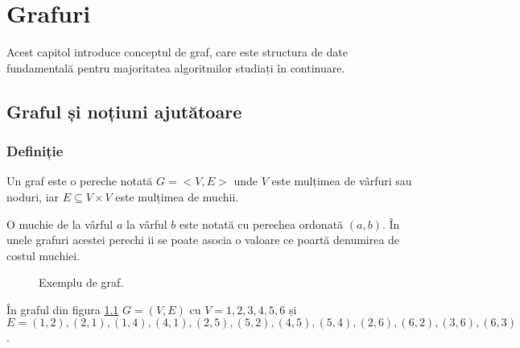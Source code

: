 \chapter{Grafuri}

Acest capitol introduce conceptul de graf, care este structura de date fundamentală pentru majoritatea algoritmilor studiați în continuare.

\section{Graful și noțiuni ajutătoare}

\subsection{Definiție}

Un graf este o pereche notată $G=<V,E>$ unde $V$ este mulțimea de vârfuri sau noduri, iar $E\subseteq V \times V$ este mulțimea de muchii.

O muchie de la vârful $a$ la vârful $b$ este notată cu perechea ordonată $(a,b)$. În unele grafuri acestei perechi ii se poate asocia o valoare ce poartă denumirea de costul muchiei.

\begin{figure}[H] 
	\centering	
	{
	}
	\caption{Exemplu de graf.} 
	\label{fig:simplegraph}
\end{figure}

În graful din figura \ref{fig:simplegraph} $G=(V,E)$ cu $V={1,2,3,4,5,6}$ și $E=(1,2),(2,1),(1,4),(4,1),(2,5),(5,2),(4,5),(5,4),(2,6),(6,2),(3,6),(6,3)$.

